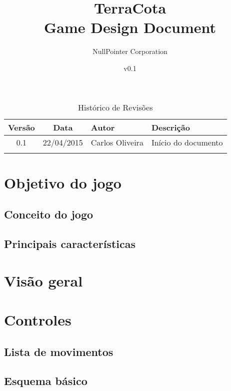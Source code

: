 \documentclass[12pt]{article}
\begin{document}
\title{TerraCota\\Game Design Document}
\author{NullPointer Corporation}
\date{v0.1}
\maketitle

\newpage

\tableofcontents

\newpage

\begin{table}[h]
  \centering
  \begin{tabular}{ccll}
    \toprule
    \textbf{Versão} & \textbf{Data} & \textbf{Autor} & \textbf{Descrição} \\
    \midrule
    0.1 & 22/04/2015 & Carlos Oliveira  & Início do documento \\
    \rowcolor[gray]{0.9}
    \bottomrule
  \end{tabular}
  \caption{Histórico de Revisões}
\end{table}


\newpage

\section{Objetivo do jogo}

\subsection{Conceito do jogo}

\subsection{Principais características}

\section{Visão geral}

\section{Controles}

\subsection{Lista de movimentos}

\subsection{Esquema básico}
\end{document}
